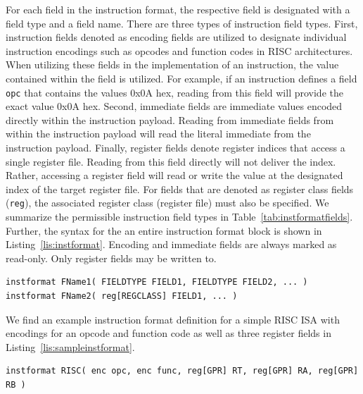 \documentclass{article}
\begin{document}
For each field in the instruction format, the respective field is designated with a field type and a field name.  There are 
three types of instruction field types.  First, instruction fields denoted as encoding fields are utilized to designate 
individual instruction encodings such as opcodes and function codes in RISC architectures.  When utilizing these fields 
in the implementation of an instruction, the value contained within the field is utilized.  For example, if an instruction 
defines a field \texttt{opc} that contains the values 0x0A hex, reading from this field will provide the exact value 0x0A hex.  
Second, immediate fields are immediate values encoded directly within the instruction payload.  Reading from immediate 
fields from within the instruction payload will read the literal immediate from the instruction payload.  Finally, register fields 
denote register indices that access a single register file.  Reading from this field directly will not deliver the index.  Rather, accessing 
a register field will read or write the value at the designated index of the target register file.    
For fields that are denoted as register class fields (\texttt{reg}), the associated register class (register file) must also be specified.  
We summarize the permissible instruction field types in Table~\ref{tab:instformatfields}.  Further, the syntax for the an entire instruction 
format block is shown in Listing~\ref{lis:instformat}.  Encoding and immediate fields are always marked as read-only.  Only 
register fields may be written to.  

\vspace{0.125in}
\begin{lstlisting}[frame=single,style=base,caption={Instruction Format Definition Syntax},captionpos=b,label={lis:instformat}]
instformat FName1( FIELDTYPE FIELD1, FIELDTYPE FIELD2, ... )
instformat FName2( reg[REGCLASS] FIELD1, ... )
\end{lstlisting}

We find an example instruction format definition for a simple RISC ISA with encodings for an opcode and function code 
as well as three register fields in Listing~\ref{lis:sampleinstformat}.  

\vspace{0.125in}
\begin{lstlisting}[frame=single,style=base,caption={Sample Instruction Format Definition},captionpos=b,label={lis:sampleinstformat}]
instformat RISC( enc opc, enc func, reg[GPR] RT, reg[GPR] RA, reg[GPR] RB )
\end{lstlisting}
\end{document}
